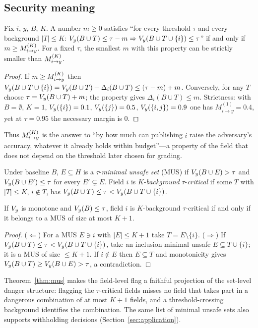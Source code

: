 \subsection{Security meaning}
\begin{theorem}\label{thm:margin}
Fix $i$, $y$, $B$, $K$. A number $m\ge 0$ satisfies ``for every threshold $\tau$ and every
background $|T|\le K$: $V_y(B\cup T)\le\tau-m \Rightarrow V_y(B\cup T\cup\{i\})\le\tau$''
if and only if $m\ge M^{(K)}_{i\to y}$. For a fixed $\tau$, the smallest $m$ with this property can be
strictly smaller than $M^{(K)}_{i\to y}$.
\end{theorem}
\begin{proof}
If $m\ge M^{(K)}_{i\to y}$ then $V_y(B\cup T\cup\{i\})=V_y(B\cup T)+\Delta_i(B\cup T)\le(\tau-m)+m$.
Conversely, for any $T$ choose $\tau=V_y(B\cup T)+m$; the property gives $\Delta_i(B\cup T)\le
m$. Strictness: with $B=\emptyset$, $K=1$, $V_y(\{i\})=0.1$, $V_y(\{j\})=0.5$,
$V_y(\{i,j\})=0.9$ one has $M^{(1)}_{i\to y}=0.4$, yet at $\tau=0.95$ the necessary margin is $0$.
\end{proof}
Thus $M^{(K)}_{i\to y}$ is the answer to ``by how much can publishing $i$ raise the adversary's accuracy,
whatever it already holds within budget''---a property of the field that does not depend on
the threshold later chosen for grading.

\begin{definition}
Under baseline $B$, $E\subseteq H$ is a $\tau$-\emph{minimal unsafe set} (MUS) if
$V_y(B\cup E)>\tau$ and $V_y(B\cup E')\le\tau$ for every $E'\subsetneq E$. Field $i$ is
$K$-\emph{background} $\tau$-\emph{critical} if some $T$ with $|T|\le K$, $i\notin T$, has
$V_y(B\cup T)\le\tau<V_y(B\cup T\cup\{i\})$.
\end{definition}

\begin{theorem}\label{thm:mus}
If $V_y$ is monotone and $V_y(B)\le\tau$, field $i$ is $K$-background $\tau$-critical if and
only if it belongs to a MUS of size at most $K+1$.
\end{theorem}
\begin{proof}
($\Leftarrow$) For a MUS $E\ni i$ with $|E|\le K+1$ take $T=E\setminus\{i\}$.
($\Rightarrow$) If $V_y(B\cup T)\le\tau<V_y(B\cup T\cup\{i\})$, take an inclusion-minimal unsafe
$E\subseteq T\cup\{i\}$; it is a MUS of size $\le K+1$. If $i\notin E$ then $E\subseteq T$ and
monotonicity gives $V_y(B\cup T)\ge V_y(B\cup E)>\tau$, a contradiction.
\end{proof}
Theorem~\ref{thm:mus} makes the field-level flag a faithful projection of the set-level
danger structure: flagging the $\tau$-critical fields misses no field that takes part in a
dangerous combination of at most $K+1$ fields, and a threshold-crossing background identifies the combination.
The same list of minimal unsafe sets also supports withholding decisions
(Section~\ref{sec:application}).



